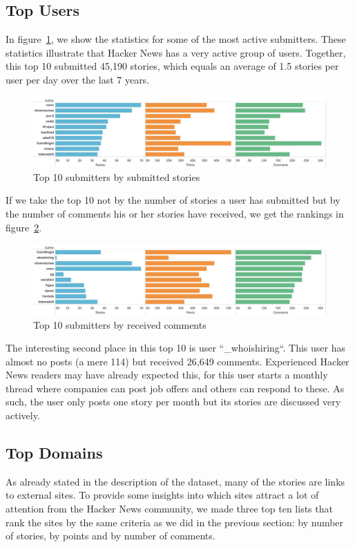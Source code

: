\subsection{Top Users}
In figure~\ref{fig:top10ByStories}, we show the statistics for some of the most active submitters. These statistics illustrate that Hacker News has a very active group of users. Together, this top 10 submitted 45,190 stories, which equals an average of 1.5 stories per user per day over the last 7 years.
\begin{figure}[ht!]
	\caption{Top 10 submitters by submitted stories}
	\label{fig:top10ByStories}
	\centering
	\includegraphics[width=12cm]{top10ByStories}
\end{figure}

If we take the top 10 not by the number of stories a user has submitted but by the number of comments his or her stories have received, we get the rankings in figure~\ref{fig:top10ByComments}.

\begin{figure}[ht!]
	\caption{Top 10 submitters by received comments}
	\label{fig:top10ByComments}
	\centering
	\includegraphics[width=12cm]{top10ByComments}
\end{figure}

The interesting second place in this top 10 is user ``\_whoishiring``. This user has almost no posts (a mere 114) but received 26,649 comments. Experienced Hacker News readers may have already expected this, for this user starts a monthly thread where companies can post job offers and others can respond to these. As such, the user only posts one story per month but its stories are discussed very actively.

\subsection{Top Domains}
As already stated in the description of the dataset, many of the stories are links to external sites. To provide some insights into which sites attract a lot of attention from the Hacker News community, we made three top ten lists that rank the sites by the same criteria as we did in the previous section: by number of stories, by points and by number of comments.

